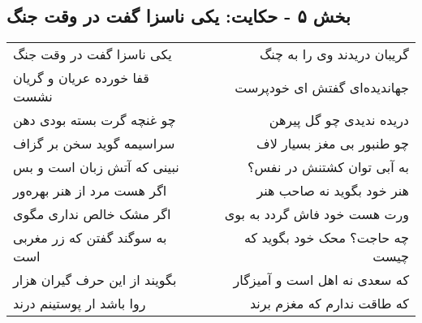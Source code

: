 \begin{center}
\section*{بخش ۵ - حکایت: یکی ناسزا گفت در وقت جنگ}
\label{sec:005}
\begin{longtable}{l p{0.5cm} r}
یکی ناسزا گفت در وقت جنگ
&&
گریبان دریدند وی را به چنگ
\\
قفا خورده عریان و گریان نشست
&&
جهاندیده‌ای گفتش ای خودپرست
\\
چو غنچه گرت بسته بودی دهن
&&
دریده ندیدی چو گل پیرهن
\\
سراسیمه گوید سخن بر گزاف
&&
چو طنبور بی مغز بسیار لاف
\\
نبینی که آتش زبان است و بس
&&
به آبی توان کشتنش در نفس؟
\\
اگر هست مرد از هنر بهره‌ور
&&
هنر خود بگوید نه صاحب هنر
\\
اگر مشک خالص نداری مگوی
&&
ورت هست خود فاش گردد به بوی
\\
به سوگند گفتن که زر مغربی است
&&
چه حاجت؟ محک خود بگوید که چیست
\\
بگویند از این حرف گیران هزار
&&
که سعدی نه اهل است و آمیزگار
\\
روا باشد ار پوستینم درند
&&
که طاقت ندارم که مغزم برند
\\
\end{longtable}
\end{center}
